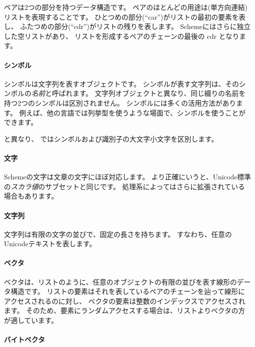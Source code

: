 ペアは2つの部分を持つデータ構造です。
ペアのほとんどの用途は(単方向連結)リストを表現することです。
ひとつめの部分(``car'')がリストの最初の要素を表し、
ふたつめの部分(``cdr'')がリストの残りを表します。
Schemeにはさらに独立した空リストがあり、
リストを形成するペアのチェーンの最後の cdr となります。

\paragraph{シンボル}

シンボルは文字列を表すオブジェクトです。
シンボルが表す文字列は、そのシンボルの\textit{名前}と呼ばれます。
文字列オブジェクトと異なり、同じ綴りの名前を持つ2つのシンボルは区別されません。
シンボルには多くの活用方法があります。
例えば、他の言語では列挙型を使うような場面で、シンボルを使うことができます。

\rfivers と異なり、 \rsevenrs ではシンボルおよび識別子の大文字小文字を区別します。

\paragraph{文字}

Schemeの文字は文章の文字にほぼ対応します。
より正確にいうと、Unicode標準の\textit{スカラ値}のサブセットと同じです。
処理系によってはさらに拡張されている場合もあります。

\paragraph{文字列}

文字列は有限の文字の並びで、固定の長さを持ちます。
すなわち、任意のUnicodeテキストを表します。

\paragraph{ベクタ}

ベクタは、リストのように、任意のオブジェクトの有限の並びを表す線形のデータ構造です。
リストの要素はそれを表しているペアのチェーンを辿って線形にアクセスされるのに対し、
ベクタの要素は整数のインデックスでアクセスされます。
そのため、要素にランダムアクセスする場合は、リストよりベクタの方が適しています。

\paragraph{バイトベクタ}

